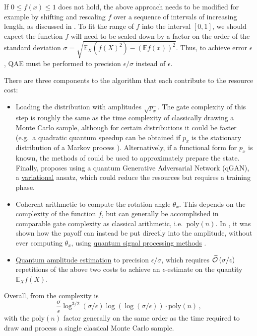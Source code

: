 \begin{refsection}
If $0 \leq f(x) \leq 1$ does not hold, the above approach needs to be modified for example by shifting and rescaling $f$ over a sequence of intervals of increasing length, as discussed in \cite{montanaro2015QMonteCarlo, rebentrost2018MonteCarloDerivatives}. To fit the range of $f$ into the interval $[0,1]$, we should expect the function $f$ will need to be scaled down by a factor on the order of the standard deviation $\sigma = \sqrt{\mathbb{E}_X(f(X)^2)-(\mathbb{E}f(x))^2}$. Thus, to achieve error $\epsilon$, QAE must be performed to precision $\epsilon/\sigma$ instead of $\epsilon$. 

There are three components to the algorithm that each contribute to the resource cost:
\begin{itemize}
    \item Loading the distribution with amplitudes $\sqrt{p_x}$. The gate complexity of this step is roughly the same as the time complexity of classically drawing a Monte Carlo sample, although for certain distributions it could be faster (e.g.~a quadratic quantum speedup can be obtained if $p_x$ is the stationary distribution of a Markov process \cite{szegedy2004QMarkovChainSearch}). Alternatively, if a functional form for $p_x$ is known, the methods of \cite{mcardle2022StatePreparation} could be used to approximately prepare the state.  Finally, \cite{stamatopoulos2020option} proposes using a quantum Generative Adversarial Network (qGAN), a \hyperref[prim:VQA]{variational} ansatz, which could reduce the resources but requires a training phase. 
    \item Coherent arithmetic to compute the rotation angle $\theta_x$. This depends on the complexity of the function $f$, but can generally be accomplished in comparable gate complexity as classical arithmetic, i.e.~$\mathrm{poly}(n)$. In \cite{stamatopoulos2023derivativeQSP}, it was shown how the payoff can instead be put directly into the amplitude, without ever computing $\theta_x$, using \hyperref[prim:QSP]{quantum signal processing methods} \cite{mcardle2022StatePreparation}. 
    \item \hyperref[prim:AmpEst]{Quantum amplitude estimation} to precision $\epsilon/\sigma$, which requires $\widetilde{\mathcal{O}}\left( \sigma/\epsilon \right)$ repetitions of the above two costs to achieve an $\epsilon$-estimate on the quantity $\mathbb{E}_X f(X)$.  
\end{itemize}

Overall, from \cite[Theorem 2.5]{montanaro2015QMonteCarlo} the complexity is 
\begin{equation}
    \frac{\sigma}{\epsilon}\log^{3/2}(\sigma/\epsilon)\log(\log(\sigma/\epsilon)) \cdot \mathrm{poly}(n)\,,
\end{equation}
with the $\mathrm{poly}(n)$ factor generally on the same order as the time required to draw and process a single classical Monte Carlo sample. 


\end{refsection}
